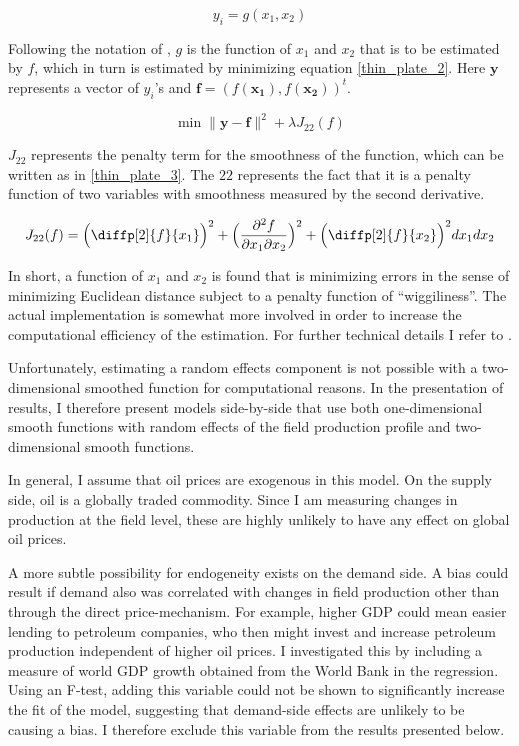 \documentclass[12pt]{article}
\begin{document}
	\begin{equation}
	y_i = g(x_1, x_2)
	\label{thin_plate_1}
	\end{equation}

Following the notation of \citet{wood_generalized_2006}, $g$ is the function of $x_1$ and $x_2$ that is to be estimated by $f$, which in turn is estimated by minimizing equation \ref{thin_plate_2}.  Here $\boldsymbol{y}$ represents a vector of $y_i$'s and $\boldsymbol{f} = (f(\boldsymbol{x_1}),f(\boldsymbol{x_2}))^t$.   

	\begin{equation}
\min \|\boldsymbol{y-f}\|^2 + \lambda J_{22}(f)
\label{thin_plate_2}
	\end{equation}

$J_{22}$ represents the penalty term for the smoothness of the function, which can be written as in \ref{thin_plate_3}.  The $22$ represents the fact that it is a penalty function of two variables with smoothness measured by the second derivative.

	\begin{equation}
	J_{22}(f)= \Big(  \diffp[2]{f}{x_1} \Big)^2 +
	 \Big(\frac{\partial^2 f}{\partial x_1 \partial x_2}\Big)^2 + 
	\Big(\diffp[2]{f}{x_2} \Big)^2dx_1 dx_2
\label{thin_plate_3}
	\end{equation}

In short, a function of $x_1$ and $x_2$ is found that is minimizing errors in the sense of minimizing Euclidean distance subject to a penalty function of “wiggiliness”.  The actual implementation is somewhat more involved in order to increase the computational efficiency of the estimation.  For further technical details I refer to \citet{wood_thin_2003}. 

Unfortunately, estimating a random effects component is not possible with a two-dimensional smoothed function for computational reasons.  In the presentation of results, I therefore present models side-by-side that use both one-dimensional smooth functions with random effects of the field production profile and two-dimensional smooth functions.

In general, I assume that oil prices are exogenous in this model. On the supply side, oil is a globally traded commodity.  Since I am measuring changes in production at the field level, these are highly unlikely to have any effect on global oil prices.

A more subtle possibility for endogeneity exists on the demand side. A bias could result if demand also was correlated with changes in field production other than through the direct price-mechanism. For example, higher GDP could mean easier lending to petroleum companies, who then might invest and increase petroleum production independent of higher oil prices. I investigated this by including a measure of world GDP growth obtained from the World Bank in the regression. Using an F-test, adding this variable could not be shown to significantly increase the fit of the model, suggesting that demand-side effects are unlikely to be causing a bias. I therefore exclude this variable from the results presented below.
\end{document}
